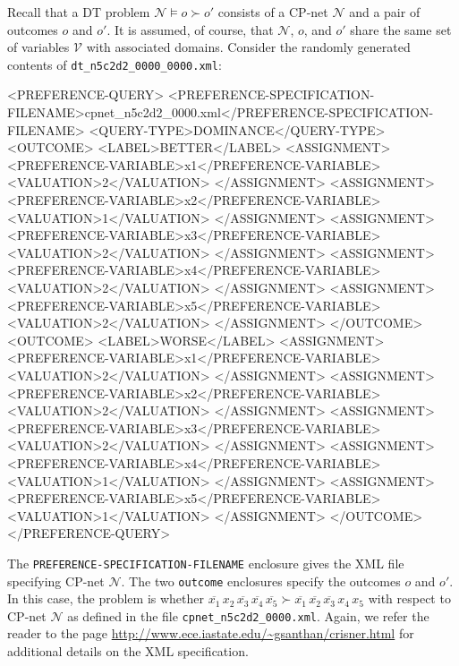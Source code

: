 \documentclass{article}
\begin{document}
Recall that a DT problem $\mathcal{N} \models o \succ o'$ consists of
a CP-net $\mathcal{N}$ and a pair of outcomes $o$ and $o'$.  It is
assumed, of course, that $\mathcal{N}$, $o$, and $o'$ share the same
set of variables $\mathcal{V}$ with associated domains.  
Consider the randomly generated contents of \verb|dt_n5c2d2_0000_0000.xml|:
\begin{verbnobox}
<PREFERENCE-QUERY>
  <PREFERENCE-SPECIFICATION-FILENAME>cpnet_n5c2d2_0000.xml</PREFERENCE-SPECIFICATION-FILENAME>
  <QUERY-TYPE>DOMINANCE</QUERY-TYPE>
  <OUTCOME>
    <LABEL>BETTER</LABEL>
    <ASSIGNMENT>
      <PREFERENCE-VARIABLE>x1</PREFERENCE-VARIABLE>
      <VALUATION>2</VALUATION>
    </ASSIGNMENT>
    <ASSIGNMENT>
      <PREFERENCE-VARIABLE>x2</PREFERENCE-VARIABLE>
      <VALUATION>1</VALUATION>
    </ASSIGNMENT>
    <ASSIGNMENT>
      <PREFERENCE-VARIABLE>x3</PREFERENCE-VARIABLE>
      <VALUATION>2</VALUATION>
    </ASSIGNMENT>
    <ASSIGNMENT>
      <PREFERENCE-VARIABLE>x4</PREFERENCE-VARIABLE>
      <VALUATION>2</VALUATION>
    </ASSIGNMENT>
    <ASSIGNMENT>
      <PREFERENCE-VARIABLE>x5</PREFERENCE-VARIABLE>
      <VALUATION>2</VALUATION>
    </ASSIGNMENT>
  </OUTCOME>
  <OUTCOME>
    <LABEL>WORSE</LABEL>
    <ASSIGNMENT>
      <PREFERENCE-VARIABLE>x1</PREFERENCE-VARIABLE>
      <VALUATION>2</VALUATION>
    </ASSIGNMENT>
    <ASSIGNMENT>
      <PREFERENCE-VARIABLE>x2</PREFERENCE-VARIABLE>
      <VALUATION>2</VALUATION>
    </ASSIGNMENT>
    <ASSIGNMENT>
      <PREFERENCE-VARIABLE>x3</PREFERENCE-VARIABLE>
      <VALUATION>2</VALUATION>
    </ASSIGNMENT>
    <ASSIGNMENT>
      <PREFERENCE-VARIABLE>x4</PREFERENCE-VARIABLE>
      <VALUATION>1</VALUATION>
    </ASSIGNMENT>
    <ASSIGNMENT>
      <PREFERENCE-VARIABLE>x5</PREFERENCE-VARIABLE>
      <VALUATION>1</VALUATION>
    </ASSIGNMENT>
  </OUTCOME>
</PREFERENCE-QUERY>
\end{verbnobox}
The \verb|PREFERENCE-SPECIFICATION-FILENAME| enclosure gives the XML
file specifying CP-net $\mathcal{N}$.  The two \verb|outcome|
enclosures specify the outcomes $o$ and $o'$.  In this case, the
problem is whether
$ \overline{x_1}\,x_2\,\overline{x_3}\,\overline{x_4}\,\overline{x_5}
\succ \overline{x_1}\,\overline{x_2}\,\overline{x_3}\,x_4\,x_5$
with respect to CP-net $\mathcal{N}$ as defined in the file
\verb|cpnet_n5c2d2_0000.xml|.
Again, we refer the reader to the page
\url{http://www.ece.iastate.edu/~gsanthan/crisner.html} for additional
details on the XML specification.
\end{document}
